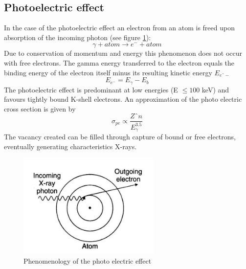 \subsection{Photoelectric effect}

In the case of the photoelectric effect an electron from an atom is freed upon absorption of the incoming photon (see figure \ref{fig:photo_electric}):
\begin{equation}
\gamma + atom \rightarrow e^{-} + atom
\end{equation}
Due to conservation of momentum and energy this phenomenon does not occur with free electrons. 
The gamma energy transferred to the electron equals the binding energy of the electron itself minus its resulting kinetic energy $E_{eˆ{-}}$ 
\begin{equation}
E_{e^{-}} = E_{\gamma} - E_{b}
\end{equation}
The photoelectric effect is predominant at low energies (E $\leq 100$ keV) and favours tightly bound K-shell electrons. An approximation of the photo electric cross section is given by
\begin{equation}
\sigma _{pe} \propto \frac{Zˆ{n}}{E_{\gamma}^{3.5}}
\end{equation}
The vacancy created can be filled through capture of bound or free electrons, eventually generating characteristics X-rays.  

\begin{figure}[htbp]
\centering
\includegraphics[width=7cm]{../Pictures/Chapter_2/photo_el_2}
\caption[Photo electric effect]{Phenomenology of the photo electric effect}
\label{fig:photo_electric}
\end{figure}

